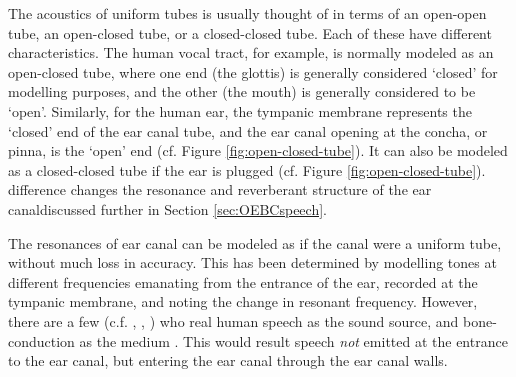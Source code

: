 The acoustics of uniform tubes is usually thought of in terms of an open-open tube, an open-closed tube, or a closed-closed tube.  Each of these have different \DIFdelbegin {}\DIFdelend \DIFaddbegin {}\DIFaddend characteristics. The human vocal tract, for example, is normally modeled as an open-closed tube, where one end (the glottis) is generally considered `closed' for modelling purposes, and the other (the mouth) is generally considered to be `open'.  Similarly, for the human ear, the tympanic membrane represents the `closed' end of the ear canal tube, and the ear canal opening at the concha, or pinna, is the `open' end (cf. Figure \ref{fig:open-closed-tube}).  It can also be modeled as a closed-closed tube if the ear is plugged (cf. Figure \ref{fig:open-closed-tube}). \DIFdelbegin {}\DIFdelend \DIFaddbegin {}\DIFaddend difference changes the resonance and reverberant structure of the ear canal\DIFdelbegin {}\DIFdelend \DIFaddbegin {}\DIFaddend discussed further in Section \ref{sec:OEBCspeech}.  


The resonances of ear canal can be modeled as if the canal were a uniform tube, without much loss in accuracy.  This has been determined by modelling tones at different frequencies emanating from the entrance of the ear, recorded at the tympanic membrane, and noting the change in resonant frequency.  However, there are a few (c.f. \cite{bekesy:48}, \cite{porschmann:00}, \cite{reinfeldt:10}) who \DIFdelbegin {}\DIFdelend \DIFaddbegin {}\DIFaddend real human speech as the sound source, and bone-conduction as the medium \DIFaddbegin {}\DIFaddend .  This would result \DIFdelbegin {}\DIFdelend \DIFaddbegin {}\DIFaddend speech \textit{not} emitted at the entrance to the ear canal, but entering the ear canal through the ear canal walls.
%

